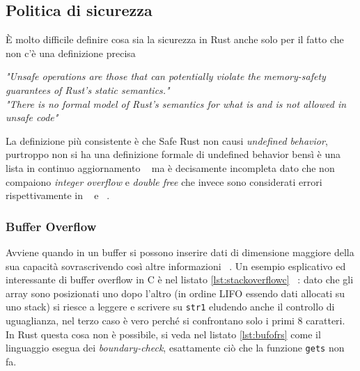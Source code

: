 \documentclass{article}
\begin{document}
\subsection{Politica di sicurezza} \label{sec:politica_di_sicurezza}
È molto difficile definire cosa sia la sicurezza in Rust anche solo per il fatto che non c'è una definizione precisa
\begin{center}
	\textit{"Unsafe operations are those that can potentially violate the memory-safety guarantees of Rust's static semantics."} ~\cite[14]{rust:reference} \\
	\textit{"There is no formal model of Rust's semantics for what is and is not allowed in unsafe code"} ~\cite[14.3]{rust:reference}
\end{center}
La definizione più consistente è che Safe Rust non causi \emph{undefined behavior}, purtroppo non si ha una definizione formale di undefined behavior bensì è una lista in continuo aggiornamento ~\cite[14.3]{rust:reference} ma è decisamente incompleta dato che non compaiono \emph{integer overflow} e \emph{double free} che invece sono considerati errori rispettivamente in ~\cite[3.2]{rust:language} e ~\cite[4.1]{rust:language}.

\subsubsection{Buffer Overflow}
Avviene quando in un buffer si possono inserire dati di dimensione maggiore della sua capacità sovrascrivendo così altre informazioni ~\cite{nist:800}. 
Un esempio esplicativo ed interessante di buffer overflow in C è nel listato \ref{lst:stackoverflowc} ~\cite[7.5]{stallings:os}: dato che gli array sono posizionati uno dopo l'altro (in ordine LIFO essendo dati allocati su uno stack) si riesce a leggere e scrivere su \texttt{str1} eludendo anche il controllo di uguaglianza, nel terzo caso è vero perché si confrontano solo i primi 8 caratteri. In Rust questa cosa non è possibile, si veda nel listato \ref{lst:bufofrs} come il linguaggio esegua dei \emph{boundary-check}, esattamente ciò che la funzione \texttt{gets} non fa. 






\end{document}
